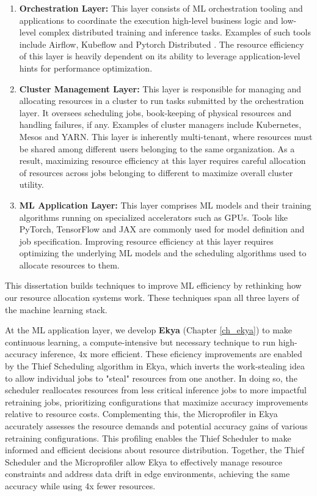 \begin{enumerate}
    \item \textbf{Orchestration Layer:} This layer consists of ML orchestration tooling and applications to coordinate the execution high-level business logic and low-level complex distributed training and inference tasks. Examples of such tools include Airflow\cite{airflow}, Kubeflow\cite{kubeflow} and Pytorch Distributed \cite{pytorch}. The resource efficiency of this layer is heavily dependent on its ability to leverage application-level hints for performance optimization. 
    
    \item \textbf{Cluster Management Layer:} This layer is responsible for managing and allocating resources in a cluster to run tasks submitted by the orchestration layer. It oversees scheduling jobs, book-keeping of physical resources and handling failures, if any. Examples of cluster managers include Kubernetes\cite{kubernetes}, Mesos\cite{mesos} and YARN\cite{yarn}. This layer is inherently multi-tenant, where resources must be shared among different users belonging to the same organization. As a result, maximizing resource efficiency at this layer requires careful allocation of resources across jobs belonging to different to maximize overall cluster utility.   
    
    \item \textbf{ML Application Layer:} This layer comprises ML models and their training algorithms running on specialized accelerators such as GPUs. Tools like PyTorch\cite{pytorch}, TensorFlow\cite{tensorflow} and JAX\cite{jax2018github} are commonly used for model definition and job specification. Improving resource efficiency at this layer requires optimizing the underlying ML models and the scheduling algorithms used to allocate resources to them.
\end{enumerate}

This dissertation builds techniques to improve ML efficiency by rethinking how our resource allocation systems work. These techniques span all three layers of the machine learning stack.

At the ML application layer, we develop \textbf{Ekya} (Chapter \ref{ch_ekya}) to make continuous learning, a compute-intensive but necessary technique to run high-accuracy inference, 4x more efficient. These eficiency improvements are enabled by the Thief Scheduling algorithm in Ekya, which inverts the work-stealing idea \cite{workstealing} to allow individual jobs to "steal" resources from one another. In doing so, the scheduler reallocates resources from less critical inference jobs to more impactful retraining jobs, prioritizing configurations that maximize accuracy improvements relative to resource costs. Complementing this, the Microprofiler in Ekya accurately assesses the resource demands and potential accuracy gains of various retraining configurations. This profiling enables the Thief Scheduler to make informed and efficient decisions about resource distribution. Together, the Thief Scheduler and the Microprofiler allow Ekya to effectively manage resource constraints and address data drift in edge environments, achieving the same accuracy while using 4x fewer resources.

